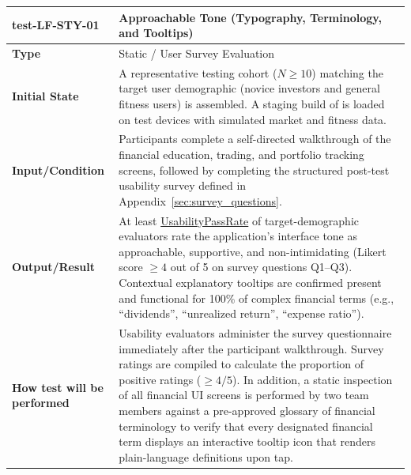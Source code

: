 \documentclass[12pt, titlepage]{article}
\newcommand{\const}[1]{\hyperlink{const:#1}{\textsf{#1}}}
\begin{document}
\vspace{1em}

\noindent\begin{tabularx}{\textwidth}{>{\raggedright\arraybackslash}p{3.5cm}X}
  \toprule
  \textbf{test-LF-STY-01}\label{test:LF-STY-01} & \textbf{Approachable Tone (Typography, Terminology, and Tooltips)}\\
  \midrule
  \textbf{Type} & Static / User Survey Evaluation\\
  \textbf{Initial State} & A representative testing cohort ($N \ge 10$) matching the target user demographic (novice investors and general fitness users) is assembled. A staging build of \progname{} is loaded on test devices with simulated market and fitness data.\\
  \textbf{Input/Condition} & Participants complete a self-directed walkthrough of the financial education, trading, and portfolio tracking screens, followed by completing the structured post-test usability survey defined in Appendix~\ref{sec:survey_questions}.\\
  \textbf{Output/Result} & At least \const{UsabilityPassRate} of target-demographic evaluators rate the application's interface tone as approachable, supportive, and non-intimidating (Likert score $\ge 4$ out of 5 on survey questions Q1--Q3). Contextual explanatory tooltips are confirmed present and functional for 100\% of complex financial terms (e.g., ``dividends'', ``unrealized return'', ``expense ratio'').\\
  \textbf{How test will be performed} & Usability evaluators administer the survey questionnaire immediately after the participant walkthrough. Survey ratings are compiled to calculate the proportion of positive ratings ($\ge 4/5$). In addition, a static inspection of all financial UI screens is performed by two team members against a pre-approved glossary of financial terminology to verify that every designated financial term displays an interactive tooltip icon that renders plain-language definitions upon tap.\\
  \bottomrule
\end{tabularx}

\vspace{1em}
\end{document}
